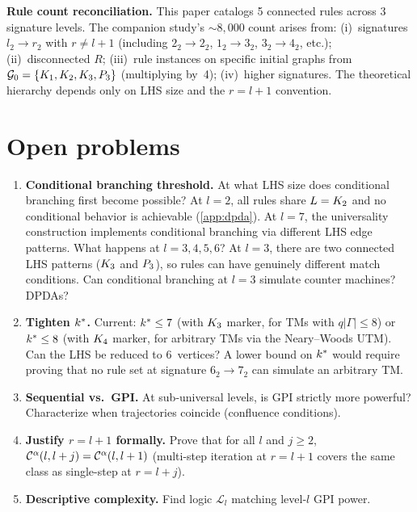 \documentclass{../shared/primo}
\begin{document}
\textbf{Rule count reconciliation.} This paper catalogs 5 connected rules across 3 signature levels. The companion study's ${\sim}8{,}000$ count arises from: (i)~signatures $l_2 \to r_2$ with $r \neq l+1$ (including $2_2 \to 2_2$, $1_2 \to 3_2$, $3_2 \to 4_2$, etc.); (ii)~disconnected $R$; (iii)~rule instances on specific initial graphs from $\mathcal{G}_0 = \{K_{1}, K_{2}, K_{3}, P_{3}\}$ (multiplying by~4); (iv)~higher signatures. The theoretical hierarchy depends only on LHS size and the $r = l+1$ convention.


\section{Open problems}
\label{sec:open}

\begin{enumerate}
\item \textbf{Conditional branching threshold.} At what LHS size does conditional branching first become possible? At $l = 2$, all rules share $L = K_{2}$ and no conditional behavior is achievable (\cref{app:dpda}). At $l = 7$, the universality construction implements conditional branching via different LHS edge patterns. What happens at $l = 3, 4, 5, 6$? At $l = 3$, there are two connected LHS patterns ($K_{3}$ and $P_{3}$), so rules can have genuinely different match conditions. Can conditional branching at $l = 3$ simulate counter machines? DPDAs?

\item \textbf{Tighten $k^*$.} Current: $k^* \leq 7$ (with $K_{3}$ marker, for TMs with $q|\Gamma| \leq 8$) or $k^* \leq 8$ (with $K_{4}$ marker, for arbitrary TMs via the Neary--Woods UTM). Can the LHS be reduced to 6~vertices? A lower bound on $k^*$ would require proving that no rule set at signature $6_2 \to 7_2$ can simulate an arbitrary TM.

\item \textbf{Sequential vs.\ GPI\@.} At sub-universal levels, is GPI strictly more powerful? Characterize when trajectories coincide (confluence conditions).

\item \textbf{Justify $r = l+1$ formally.} Prove that for all $l$ and $j \geq 2$, $\mathcal{C}_{}^{\alpha}(l, l+j) = \mathcal{C}_{}^{\alpha}(l, l+1)$ (multi-step iteration at $r = l+1$ covers the same class as single-step at $r = l+j$).

\item \textbf{Descriptive complexity.} Find logic $\mathcal{L}_l$ matching level-$l$ GPI power.


\end{enumerate}
\end{document}
